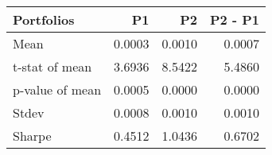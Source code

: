 \begin{tabular}{lrrr}
\toprule
Portfolios & P1 & P2 & P2 - P1 \\
\midrule
Mean & 0.0003 & 0.0010 & 0.0007 \\
t-stat of mean & 3.6936 & 8.5422 & 5.4860 \\
p-value of mean & 0.0005 & 0.0000 & 0.0000 \\
Stdev & 0.0008 & 0.0010 & 0.0010 \\
Sharpe & 0.4512 & 1.0436 & 0.6702 \\
\bottomrule
\end{tabular}
